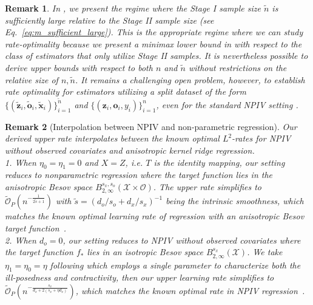 \documentclass[11pt]{article}
\newcommand{\bx}{\mathbf x}
\newcommand{\bz}{\mathbf z}
\newcommand{\bo}{\mathbf o}
\newcommand{\calO}{\mathcal{O}}
\newcommand{\calX}{\mathcal{X}}
\newcommand{\0}{\mathbf{0}}
\newtheorem{rem}{Remark}[section]
\begin{document}
\begin{rem}
\label{rem: stage_1_lower_bound}
    In , we present the regime where the Stage I sample size $\tilde{n}$ is sufficiently large relative to the Stage II sample size (see Eq.~\eqref{eq:m_sufficient_large}). 
    This is the appropriate regime where we can study rate-optimality because we present a minimax lower bound in  with respect to the class of estimators that only utilize Stage II samples. 
    It is nevertheless possible to derive upper bounds with respect to both $n$ and $\tilde{n}$ without restrictions on the relative size of $n, \tilde{n}$. It remains a challenging open problem, however, to establish rate optimality for estimators utilizing a split dataset of the form $\{(\tilde{\bz}_i, \tilde{\bo}_i, \tilde{\bx}_i)\}_{i=1}^{\tilde{n}}$ and $\{(\bz_i, \bo_i, y_i)\}_{i=1}^{n}$, even for the standard NPIV setting \citep{chen2011rate, Chen_2018, meunier2024nonparametricinstrumentalregressionkernel}. 
\end{rem}

\begin{rem}[Interpolation between NPIV and non-parametric regression]\label{rem:interpolate}
\label{rem:ub_main_rem}
Our derived upper rate interpolates between the known optimal $L^2$-rates for NPIV without observed covariates and anisotropic kernel ridge regression.  \\
1. When $\eta_0 = \eta_1 = 0$ and $X=Z$, i.e. $T$ is the identity mapping, our setting reduces to nonparametric regression where the target function lies in the anisotropic Besov space $B_{2, \infty}^{s_x, s_o}(\calX\times\calO)$. The upper rate simplifies to $\tilde{\calO}_P(n^{-\frac{1}{2\tilde{s}+1}})$ with $\tilde{s} = (d_o/s_o + d_x/s_x)^{-1}$ being the intrinsic smoothness, which matches the known optimal learning rate of regression with an anisotropic Besov target function~\citep{hoffman2002random,hang2021optimal}. \\
2. When $d_o = 0$, our setting reduces to NPIV without observed covariates where the target function $f_\ast$ lies in an isotropic Besov space $B_{2, \infty}^{s_x}(\calX)$. We take $\eta_1 = \eta_0 = \eta$ following \citet{Chen_2018, chen2011rate} which employs a single parameter to characterize both the ill-posedness and contractivity, then our upper learning rate simplifies to $\tilde{\calO}_P(n^{-\frac{s_x}{d_x+2(s_x+\eta d_x)}})$, which matches the known optimal rate in NPIV regression~\citep[Corollary 3.1]{Chen_2018}.
\end{rem}
\end{document}
